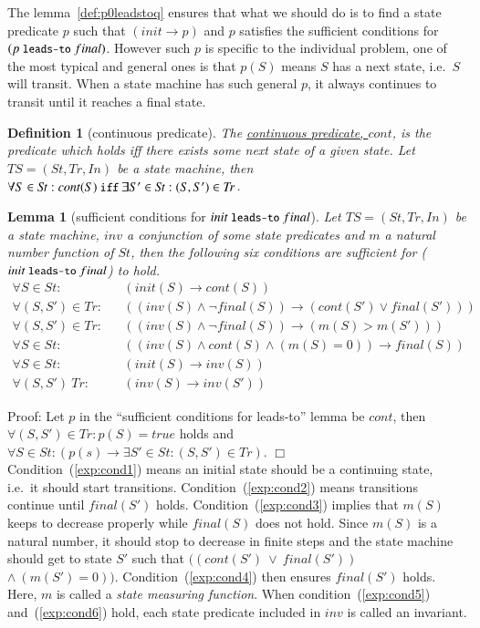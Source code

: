 \documentclass[12pt]{report}
\newtheorem{lemma}{Lemma}
\newtheorem{definition}{Definition}
\newcommand{\ra}{\rightarrow}
\newcommand{\mbstt}[1]{\mbox{\small{\tt {#1}}}}
\newcommand{\ul}{\underline}
\begin{document}
The lemma~\ref{def:p0leadstoq} ensures that what we should do is to find a state
predicate $p$ such that $(init\ra p)$ and $p$ satisfies the sufficient
conditions for $(p~\mbstt{leads-to}~final)$. However such $p$ is
specific to the individual problem, one of the most typical and
general ones is that $p(S)$ means $S$ has a next state, i.e.\ $S$ will
transit.  When a state machine has such general $p$, it always
continues to transit until it reaches a final state.

\begin{definition}[continuous predicate]
  The \ul{continuous predicate, $cont$}, is the predicate which holds
  iff there exists some next state of a given state.  Let
  $TS=(\mathit{St},\mathit{Tr},In)$ be a state machine, then $\forall S\in \mathit{St}:cont(S)
  ~\mbstt{iff}~ \exists S'\in \mathit{St}:(S,S')\in \mathit{Tr}$.
\end{definition}

\begin{lemma}[sufficient conditions for $init~\mbstt{leads-to}~final$]
  Let $TS=(\mathit{St},\mathit{Tr},In)$ be a state machine, $inv$ a conjunction of
  some state predicates and $m$ a natural number function of $\mathit{St}$,
  then the following six conditions are sufficient for
  ($init~\mbstt{leads-to}~final$) to hold.
  \begin{eqnarray}
  \label{exp:cond1}
  \forall S\in \mathit{St}:&&(init(S)\ra cont(S))\\
  \label{exp:cond2}
  \forall (S,S')\in \mathit{Tr}:&&((inv(S)\land\neg final(S))
  \ra(cont(S')\lor final(S')))\\
  \label{exp:cond3}
  \forall (S,S')\in \mathit{Tr}:&&((inv(S)\land\neg final(S))\ra(m(S)> m(S')))\\
  \label{exp:cond4}
  \forall S\in \mathit{St}:&&((inv(S)\land cont(S)\land(m(S) = 0))\ra final(S))\\
  \label{exp:cond5}
  \forall S\in \mathit{St}:&&(init(S)\ra inv(S))\\
  \label{exp:cond6}
  \forall (S,S')\ \mathit{Tr}:&&(inv(S)\ra inv(S'))
  \end{eqnarray}
\end{lemma}
Proof: Let $p$ in the ``sufficient conditions for leads-to'' lemma
be $cont$, then $\forall (S,S')\in \mathit{Tr}:p(S)=true$ holds and
$\forall S\in \mathit{St}:(p(s)\ra\exists S'\in \mathit{St}:(S,S')\in \mathit{Tr})$. $\Box$\\

Condition~(\ref{exp:cond1}) means an initial state should be a
continuing state, i.e.\ it should start
transitions. Condition~(\ref{exp:cond2}) means transitions continue
until $final(S')$ holds. Condition~(\ref{exp:cond3}) implies that
$m(S)$ keeps to decrease properly while $final(S)$ does not
hold. Since $m(S)$ is a natural number, it should stop to decrease in
finite steps and the state machine should get to state $S'$ such that
$((cont(S')\ \lor\ final(S'))$ $\land\ (m(S') = 0))$.
Condition~(\ref{exp:cond4}) then ensures $final(S')$ holds. Here, $m$ is
called a {\it state measuring function}. When
condition~(\ref{exp:cond5}) and~(\ref{exp:cond6}) hold, each state
predicate included in $inv$ is called an invariant.
\end{document}
